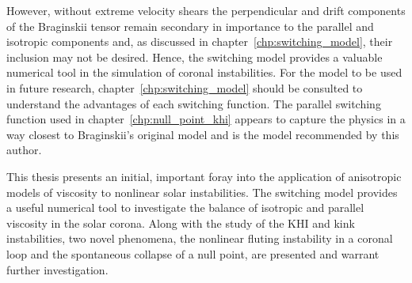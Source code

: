 However, without extreme velocity shears the perpendicular and drift components of the Braginskii tensor remain secondary in importance to the parallel and isotropic components and, as discussed in chapter~\ref{chp:switching_model}, their inclusion may not be desired. Hence, the switching model provides a valuable numerical tool in the simulation of coronal instabilities. For the model to be used in future research, chapter~\ref{chp:switching_model} should be consulted to understand the advantages of each switching function. The parallel switching function used in chapter~\ref{chp:null_point_khi} appears to capture the physics in a way closest to Braginskii's original model and is the model recommended by this author.

This thesis presents an initial, important foray into the application of anisotropic models of viscosity to nonlinear solar instabilities. The switching model provides a useful numerical tool to investigate the balance of isotropic and parallel viscosity in the solar corona. Along with the study of the KHI and kink instabilities, two novel phenomena, the nonlinear fluting instability in a coronal loop and the spontaneous collapse of a null point, are presented and warrant further investigation.
